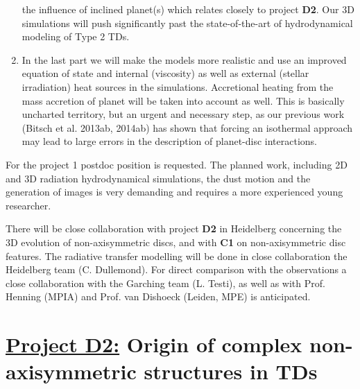 \begin{enumerate}
   the influence of inclined planet(s) which relates closely to
   project {\bf D2}. Our 3D simulations will push significantly
   past the state-of-the-art of hydrodynamical modeling of
   Type 2 TDs. 
\item In the last part we will make the models more realistic and use an improved equation of state
    and internal (viscosity) as well as external (stellar irradiation) heat sources in the simulations. 
    Accretional heating from the mass accretion of planet will be
    taken into account as well. This is basically uncharted territory,
    but an urgent and necessary step, as our previous work (Bitsch et al. 2013ab, 2014ab) has shown
    that forcing an isothermal approach may lead to large errors in
    the description of planet-disc interactions. 
\end{enumerate}

\noindent 

For the project 1 postdoc position is requested. The planned work, including 2D and 3D radiation hydrodynamical simulations,
the dust motion and the generation of images is very demanding and requires a more experienced young researcher.

\noindent 

\vspace{0.5em}
There will be close collaboration with project {\bf D2} in Heidelberg concerning the 3D evolution of
non-axisymmetric discs, and with {\bf C1} on non-axisymmetric disc features.
The radiative transfer modelling will be done in close collaboration the Heidelberg team (C. Dullemond).
For direct comparison with the observations a close collaboration with
the Garching team (L. Testi), as well as with 
Prof. Henning (MPIA) and Prof. van Dishoeck (Leiden, MPE) is
anticipated.




\def\remove#1{}


\section*{\underline{Project D2:} 
Origin of complex non-axisymmetric structures in TDs}
                
